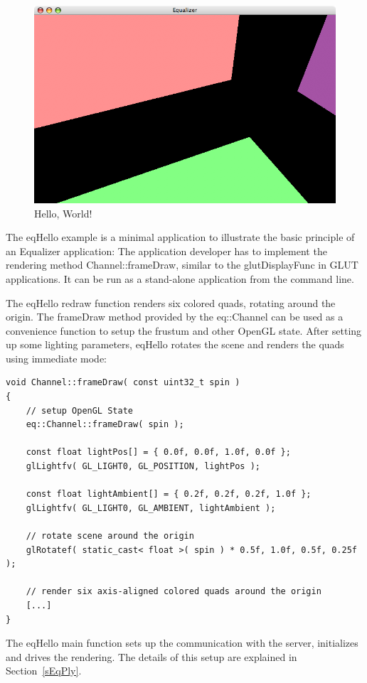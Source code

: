 \documentclass[10pt,a4]{scrartcl}
\newcommand{\sref}[1]{Section~\ref{#1}}
\begin{document}
\begin{figure}
  \includegraphics[width=.618\textwidth]{images/eqHello.png}
  {\caption{\label{fHello}Hello, World!}}
\end{figure}
The \textsf{eqHello} example is a minimal application to illustrate the
basic principle of an Equalizer application: The application developer
has to implement the rendering method \textsf{Channel::frameDraw},
similar to the \textsf{glutDisplayFunc} in GLUT applications. It can be
run as a stand-alone application from the command line.

The \textsf{eqHello} redraw function renders six colored quads, rotating
around the origin. The \textsf{frameDraw} meth\-od provided by the
\textsf{eq::Channel} can be used as a convenience function to setup the
frustum and other OpenGL state. After setting up some lighting
parameters, \textsf{eqHello} rotates the scene and renders the quads
using immediate mode:

{\footnotesize\begin{lstlisting}
void Channel::frameDraw( const uint32_t spin )
{
    // setup OpenGL State
    eq::Channel::frameDraw( spin );
    
    const float lightPos[] = { 0.0f, 0.0f, 1.0f, 0.0f };
    glLightfv( GL_LIGHT0, GL_POSITION, lightPos );

    const float lightAmbient[] = { 0.2f, 0.2f, 0.2f, 1.0f };
    glLightfv( GL_LIGHT0, GL_AMBIENT, lightAmbient );

    // rotate scene around the origin
    glRotatef( static_cast< float >( spin ) * 0.5f, 1.0f, 0.5f, 0.25f );

    // render six axis-aligned colored quads around the origin
    [...]
}
\end{lstlisting}}

The \textsf{eqHello} main function sets up the communication with the
server, initializes and drives the rendering. The details of this setup
are explained in \sref{sEqPly}.
\end{document}
